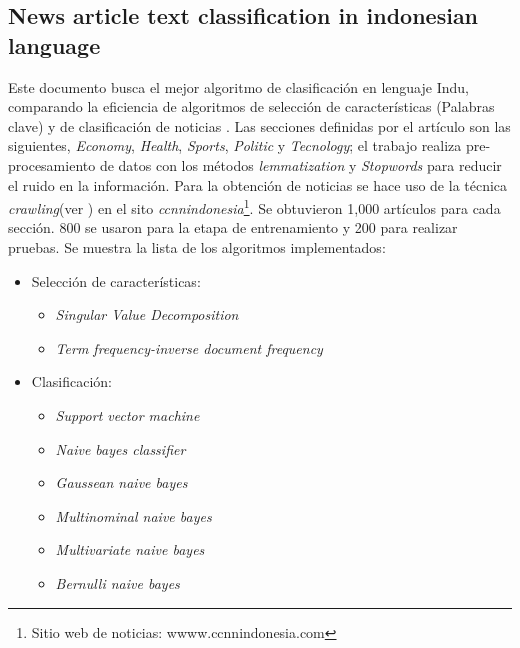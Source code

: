 
\begin{large}
	 \subsection{News article text classification in indonesian language}
\end{large}

Este documento busca el mejor algoritmo de clasificación en lenguaje Indu, comparando la eficiencia de algoritmos de selección de características (Palabras clave) y de clasificación de noticias \citep{CD8}. Las secciones definidas por el artículo son las siguientes, \textit{Economy}, \textit{Health}, \textit{Sports}, \textit{Politic} y \textit{Tecnology}; el trabajo realiza pre-procesamiento de datos con  los métodos \textit{lemmatization} y \textit{Stopwords} para reducir el ruido en la información. Para la obtención de noticias se hace uso de la técnica \textit{crawling}(ver ) en el sito \textit{ccnnindonesia}\footnote{Sitio web de noticias: wwww.ccnnindonesia.com}. Se obtuvieron 1,000 artículos para cada sección. 800 se usaron para la etapa de entrenamiento y 200 para realizar pruebas. Se muestra la lista de los algoritmos implementados:

\begin{itemize}
	\item Selección de características:
	\begin{itemize}
		\item \textit{Singular Value Decomposition}
		\item \textit{Term frequency-inverse document frequency}
	\end{itemize}

	\item Clasificación:
	\begin{itemize}
		\item \textit{Support vector machine}
		\item \textit{Naive bayes classifier}
		\item \textit{Gaussean naive bayes}
		\item \textit{Multinominal naive bayes}
		\item \textit{Multivariate naive bayes}
		\item \textit{Bernulli naive bayes}
	\end{itemize}
\end{itemize}

